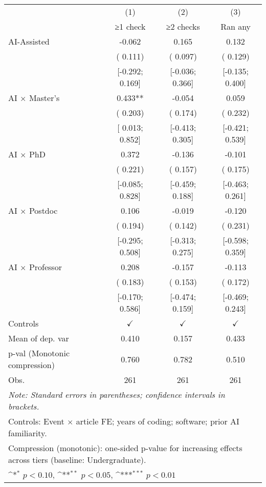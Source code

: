 \def\sym#1{\ifmmode^{#1}\else\(^{#1}\)\fi}
\begin{tabular}{l*{3}{c}}
\hline\hline
 & (1) & (2) & (3)
\\
 & ≥1 check & ≥2 checks & Ran any
 \\
\hline
AI-Assisted & -0.062 &  0.165 &  0.132
\\
 & ( 0.111) & ( 0.097) & ( 0.129)
\\
 & [-0.292;  0.169] & [-0.036;  0.366] & [-0.135;  0.400]
\\
AI × Master's &  0.433** & -0.054 &  0.059
\\
 & ( 0.203) & ( 0.174) & ( 0.232)
\\
 & [ 0.013;  0.852] & [-0.413;  0.305] & [-0.421;  0.539]
\\
AI × PhD &  0.372 & -0.136 & -0.101
\\
 & ( 0.221) & ( 0.157) & ( 0.175)
\\
 & [-0.085;  0.828] & [-0.459;  0.188] & [-0.463;  0.261]
\\
AI × Postdoc &  0.106 & -0.019 & -0.120
\\
 & ( 0.194) & ( 0.142) & ( 0.231)
\\
 & [-0.295;  0.508] & [-0.313;  0.275] & [-0.598;  0.359]
\\
AI × Professor &  0.208 & -0.157 & -0.113
\\
 & ( 0.183) & ( 0.153) & ( 0.172)
\\
 & [-0.170;  0.586] & [-0.474;  0.159] & [-0.469;  0.243]
\\
\hline
Controls & $\checkmark$ & $\checkmark$ & $\checkmark$
\\
Mean of dep. var &  0.410 &  0.157 &  0.433
\\
p-val (Monotonic compression) &  0.760 &  0.782 &  0.510
\\
Obs. & 261 & 261 & 261
\\
\hline
\hline\hline
\multicolumn{4}{l}{\it{Note:} Standard errors in parentheses; confidence intervals in brackets.}\\
\multicolumn{4}{l}{Controls: Event $\times$ article FE; years of coding; software; prior AI familiarity.}\\
\multicolumn{4}{l}{Compression (monotonic): one-sided p-value for increasing effects across tiers (baseline: Undergraduate).}\\
\multicolumn{4}{l}{\sym{*} $p<0.10$, \sym{**} $p<0.05$,  \sym{***} $p<0.01$}\\
\end{tabular}
